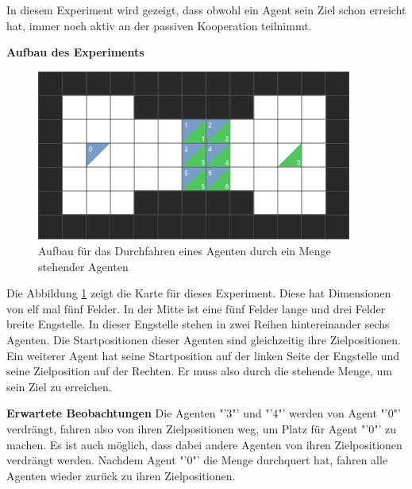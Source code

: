 In diesem Experiment wird gezeigt, dass obwohl ein Agent sein Ziel schon erreicht hat, immer noch aktiv an der passiven Kooperation teilnimmt.

\textbf{Aufbau des Experiments}
\begin{figure}[H]
    \includegraphics[height=56mm]{images/crowd_drive-through.png}
    \centering
    \caption{Aufbau für das Durchfahren eines Agenten durch ein Menge stehender Agenten}
    \label{fig:menge}
\end{figure}
Die Abbildung \ref{fig:menge} zeigt die Karte für dieses Experiment. Diese hat Dimensionen von elf mal fünf Felder. In der Mitte ist eine fünf Felder lange und drei Felder breite Engstelle. In dieser Engstelle stehen in zwei Reihen hintereinander sechs Agenten. Die Startpositionen dieser Agenten sind gleichzeitig ihre Zielpositionen. Ein weiterer Agent hat seine Startposition auf der linken Seite der Engstelle und seine Zielposition auf der Rechten. Er muss also durch die stehende Menge, um sein Ziel zu erreichen.

\textbf{Erwartete Beobachtungen}\newline
Die Agenten "'3"' und "'4"' werden von Agent "'0"' verdrängt, fahren also von ihren Zielpositionen weg, um Platz für Agent "'0"' zu machen. Es ist auch möglich, dass dabei andere Agenten von ihren Zielpositionen verdrängt werden. Nachdem Agent "'0"' die Menge durchquert hat, fahren alle Agenten wieder zurück zu ihren Zielpositionen.
